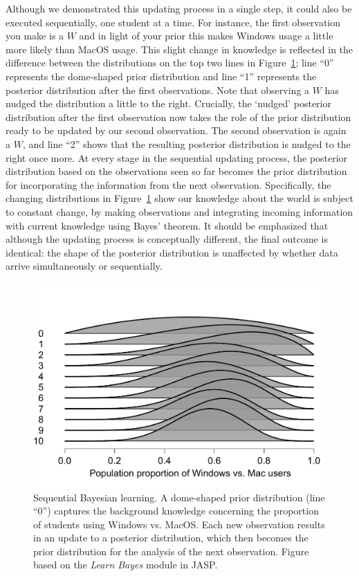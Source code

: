 \documentclass[man]{apa7}
\begin{document}
Although we demonstrated this updating process in a single step, it could also be executed sequentially, one student at a time. For instance, the first observation you make is a $W$ and in light of your prior this makes Windows usage a little more likely than MacOS usage. This slight change in knowledge is reflected in the difference between the distributions on the top two lines in Figure~\ref{fig:WindowsMacSequential}; line ``0'' represents the dome-shaped prior distribution and line ``1'' represents the posterior distribution after the first observations. Note that observing a $W$ has nudged the distribution a little to the right. Crucially, the `nudged' posterior distribution after the first observation now takes the role of the prior distribution ready to be updated by our second observation. The second observation is again a $W$, and line ``2'' shows that the resulting posterior distribution is nudged to the right once more. At every stage in the sequential updating process, the posterior distribution based on the observations seen so far becomes the prior distribution for incorporating the information from the next observation. Specifically, the changing distributions in Figure~\ref{fig:WindowsMacSequential} show our knowledge about the world is subject to constant change, by making observations and integrating incoming information with current knowledge using Bayes' theorem. It should be emphasized that although the updating process is conceptually different, the final outcome is identical: the shape of the posterior distribution is unaffected by whether data arrive simultaneously or sequentially.

\begin{figure}[h]
\begin{center}
\includegraphics[width = .65\paperwidth]{WindowsMacSequential.pdf}
\caption{Sequential Bayesian learning. A dome-shaped prior distribution (line ``0'') captures the background knowledge concerning the proportion of students using Windows vs. MacOS. Each new observation results in an update to a posterior distribution, which then becomes the prior distribution for the analysis of the next observation. Figure based on the \emph{Learn Bayes} module in JASP.}
\label{fig:WindowsMacSequential}
\end{center}
\end{figure}
\end{document}
